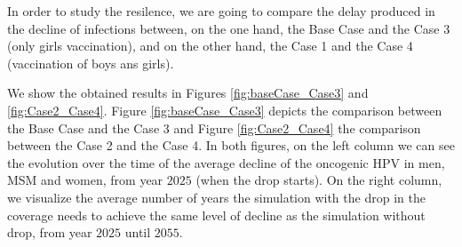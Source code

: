 In order to study the resilence, we are going to compare the delay produced in the decline of infections between, on the one hand, the Base Case and the Case 3 (only girls vaccination), and on the other hand, the Case 1 and the Case 4 (vaccination of boys ans girls).  

We show the obtained results in Figures \ref{fig:baseCase_Case3} and \ref{fig:Case2_Case4}. Figure \ref{fig:baseCase_Case3} depicts the comparison between the Base Case and the Case 3 and Figure \ref{fig:Case2_Case4} the comparison between the Case 2 and the Case 4. In both figures, on the left column we can see the evolution over the time of the average decline of the oncogenic HPV in men, MSM and women, from year $2025$ (when the drop starts). On the right column, we visualize the average number of years the simulation with the drop in the coverage needs to achieve the same level of decline as the simulation without drop, from year $2025$ until $2055$.

